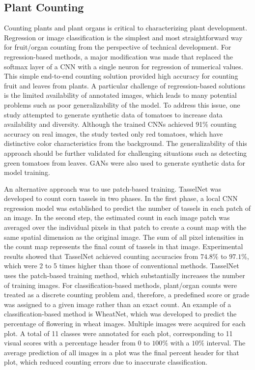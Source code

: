 \subsection{Plant Counting}
Counting plants and plant organs is critical to characterizing plant development.
Regression or image classification is the simplest and most straightforward way for fruit/organ counting from the perspective of technical development.
For regression-based methods, a major modification was made that replaced the softmax layer of a CNN with a single neuron for regression of numerical values.
This simple end-to-end counting solution provided high accuracy for counting fruit and leaves from plants. A particular challenge of regression-based solutions
is the limited availability of annotated images, which leads to many potential problems such as poor generalizability of the model. To address this issue,
one study attempted to generate synthetic data of tomatoes to increase data availability and diversity. Although the trained CNNs achieved 91\%
counting accuracy on real images, the study tested only red tomatoes, which have distinctive color characteristics from the background. The generalizability
of this approach should be further validated for challenging situations such as detecting green tomatoes from leaves. GANs were also used to generate synthetic
data for model training.

An alternative approach was to use patch-based training\cite{lu2017tasselnet}. TasselNet was developed to count corn tassels in two phases. In the first phase,
a local CNN regression model was established to predict the number of tassels in each patch of an image. In the second step, the estimated count in each image patch
was averaged over the individual pixels in that patch to create a count map with the same spatial dimension as the original image. The sum of all pixel intensities
in the count map represents the final count of tassels in that image. Experimental results showed that TasselNet achieved counting accuracies from $74.8\%$ to $97.1\%$,
which were 2 to 5 times higher than those of conventional methods. TasselNet uses the patch-based training method, which substantially increases the number of
training images. For classification-based methods, plant/organ counts were treated as a discrete counting problem and, therefore, a predefined score or grade was
assigned to a given image rather than an exact count. An example of a classification-based method is WheatNet, which was developed to predict the percentage of
flowering in wheat images. Multiple images were acquired for each plot. A total of 11 classes were annotated for each plot, corresponding to 11 visual scores with
a percentage header from $0$ to $100\%$ with a $10\%$ interval. The average prediction of all images in a plot was the final percent header for that plot, which reduced
counting errors due to inaccurate classification.


